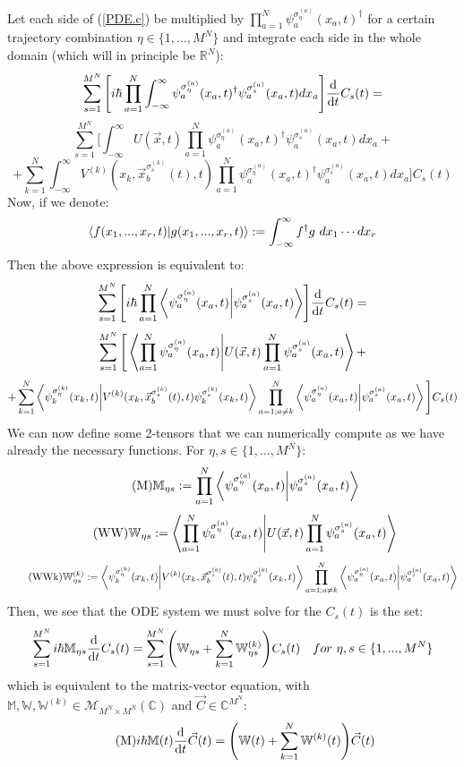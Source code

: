 \documentclass[11pt, a4paper]{article} %
\newcommand{\R}{\mathbb{R}} %
\newcommand{\M}{\mathcal{M}}
\newcommand{\C}{\mathbb{C}}
\begin{document}
Let each side of (\ref{PDE.c}) be multiplied by $\prod_{a=1}^N \psi_a^{\sigma_\eta^{(a)}}(x_a,t)^\dagger$ for a certain trajectory combination $\eta\in\{1,...,M^N \}$ and integrate each side in the whole domain (which will in principle be $\R^N$):
$$
\sum_{s=1}^{M^N} \qty[i\hbar \prod_{a=1}^N  \int_{-\infty}^\infty \psi_a^{\sigma_\eta^{(a)}}(x_a,t)^\dagger \psi_a^{\sigma_s^{(a)}}(x_a,t)dx_a] \dv{}{t}C_s(t) = 
$$
$$
\sum_{s=1}^{M^N} \Bigg[ \int_{-\infty}^\infty U(\vec{x},t) \prod_{a=1}^N \psi_a^{\sigma_\eta^{(a)}}(x_a,t)^\dagger \psi_a^{\sigma_s^{(a)}}(x_a,t)dx_a+
$$
$$
+\sum_{k=1}^N \int_{-\infty}^\infty V^{(k)}(x_k, \vec{x}^{\sigma_s^{(k)}}_b(t),t) \prod_{a=1}^N \psi_a^{\sigma_\eta^{(a)}}(x_a,t)^\dagger \psi_a^{\sigma_s^{(a)}}(x_a,t)dx_a\Bigg]C_s(t)
$$
Now, if we denote:
$$
\bra{f(x_1,...,x_r,t)}\ket{g(x_1,...,x_r,t)}:=\int_{-\infty}^\infty f^\dagger g\ dx_1\cdots dx_r
$$
Then the above expression is equivalent to:
$$
\sum_{s=1}^{M^N} \qty[i\hbar \prod_{a=1}^N  \bra{\psi_a^{\sigma_\eta^{(a)}}(x_a,t)}\ket{\psi_a^{\sigma_s^{(a)}}(x_a,t)}] \dv{}{t}C_s(t) = 
$$
$$
\sum_{s=1}^{M^N} \Bigg[\bra{\prod_{a=1}^N  \psi_a^{\sigma_\eta^{(a)}}(x_a,t)}\ket{U(\vec{x},t)  \prod_{a=1}^N \psi_a^{\sigma_s^{(a)}}(x_a,t)}+
$$
$$
+\sum_{k=1}^N\bra{\psi_k^{\sigma_\eta^{(k)}}(x_k,t)}\ket{V^{(k)}(x_k,\vec{x}_b^{\sigma_s^{(k)}}(t),t) \psi_k^{\sigma_s^{(k)}}(x_k,t)} \prod_{a=1;a\neq k}^N  \bra{\psi_a^{\sigma_\eta^{(a)}}(x_a,t)}\ket{\psi_a^{\sigma_s^{(a)}}(x_a,t)}  \Bigg]C_s(t)
$$
We can now define some 2-tensors that we can numerically compute as we have already the necessary functions. For $\eta,s \in \{1,...,M^N \}$:\vspace{-0.2cm}
\begin{equation}\label{M}\tag{M}
\mathbb{M}_{\eta s}:= \prod_{a=1}^N \bra{\psi_a^{\sigma_\eta^{(a)}}(x_a,t)}\ket{\psi_a^{\sigma_s^{(a)}}(x_a,t)}
\end{equation}
\begin{equation}\label{W}\tag{WW}
\mathbb{W}_{\eta s}:=\bra{\prod_{a=1}^N  \psi_a^{\sigma_\eta^{(a)}}(x_a,t)}\ket{U(\vec{x},t)  \prod_{a=1}^N \psi_a^{\sigma_s^{(a)}}(x_a,t)}
\end{equation}
\begin{equation}\label{PDE.c}\tag{WWk}
\mathbb{W}_{\eta s}^{(k)} :=\bra{\psi_k^{\sigma_\eta^{(k)}}(x_k,t)}\ket{V^{(k)}(x_k,\vec{x}_b^{\sigma_s^{(k)}}(t),t) \psi_k^{\sigma_s^{(k)}}(x_k,t)} \prod_{a=1;a\neq k}^N  \bra{\psi_a^{\sigma_\eta^{(a)}}(x_a,t)}\ket{\psi_a^{\sigma_s^{(a)}}(x_a,t)}
\end{equation}
Then, we see that the ODE system we must solve for the $C_s(t)$ is the set:
$$
\sum_{s=1}^{M^N} i\hbar \mathbb{M}_{\eta s} \dv{}{t}C_s(t) = \sum_{s=1}^{M^N} \qty( \mathbb{W}_{\eta s}+\sum_{k=1}^{N} \mathbb{W}^{(k)}_{\eta s})C_s(t) \quad for\ \eta,s \in \{1,...,M^N \}
$$
which is equivalent to the matrix-vector equation, with $\mathbb{M}, \mathbb{W}, \mathbb{W}^{(k)}\in \M_{M^N \times M^N}(\C)$ and $\vec{C}\in \C^{M^N}$:
\begin{equation}\label{M}\tag{M}
i\hbar \mathbb{M}(t) \dv{}{t}\vec{C}(t) =\qty( \mathbb{W}(t)+\sum_{k=1}^{N} \mathbb{W}^{(k)}(t))\vec{C}(t)
\end{equation}
\end{document}
